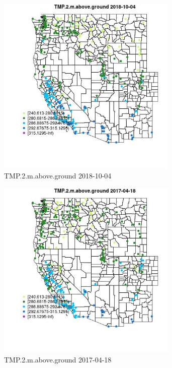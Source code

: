 \begin{figure} 
\centering  
\includegraphics[width=0.77\textwidth]{Code_Outputs/Report_ML_input_PM25_Step4_part_f_de_duplicated_aves_prioritize_24hr_obswNAs_MapObsTMP2maboveground2018-10-04.jpg} 
\caption{\label{fig:Report_ML_input_PM25_Step4_part_f_de_duplicated_aves_prioritize_24hr_obswNAsMapObsTMP2maboveground2018-10-04}TMP.2.m.above.ground 2018-10-04} 
\end{figure} 
 

\begin{figure} 
\centering  
\includegraphics[width=0.77\textwidth]{Code_Outputs/Report_ML_input_PM25_Step4_part_f_de_duplicated_aves_prioritize_24hr_obswNAs_MapObsTMP2maboveground2017-04-18.jpg} 
\caption{\label{fig:Report_ML_input_PM25_Step4_part_f_de_duplicated_aves_prioritize_24hr_obswNAsMapObsTMP2maboveground2017-04-18}TMP.2.m.above.ground 2017-04-18} 
\end{figure} 
 

